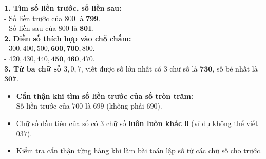 \documentclass[10pt,a4paper]{article}
\begin{document}
\vspace{-1.5mm}
\noindent
\begin{minipage}[t]{0.49\textwidth}\vspace{0pt}
\begin{tcolorbox}[
  enhanced,
  colback=green!4!white,
  colframe=green!60!black,
  arc=2mm, boxrule=0.8pt,
  left=2mm, right=2mm, top=1.8mm, bottom=1.8mm,
  title={\footnotesize\bfseries\color{white}\faCheckCircle\ 4. Bài tập thực hành tiêu biểu}
]
{\footnotesize
\textbf{1. Tìm số liền trước, số liền sau:}\\
- Số liền trước của $800$ là $\mathbf{799}$.\\
- Số liền sau của $800$ là $\mathbf{801}$.\\
\textbf{2. Điền số thích hợp vào chỗ chấm:}\\
- $300, 400, 500, \mathbf{600}, \mathbf{700}, 800$.\\
- $420, 430, 440, \mathbf{450}, \mathbf{460}, 470$.\\
\textbf{3. Từ ba chữ số $3, 0, 7$}, viết được số lớn nhất có 3 chữ số là $\mathbf{730}$, số bé nhất là $\mathbf{307}$.
}
\end{tcolorbox}
\end{minipage}
\hfill
\begin{minipage}[t]{0.49\textwidth}\vspace{0pt}
\begin{tcolorbox}[
  enhanced,
  colback=rose!4!white,
  colframe=rose!70!black,
  arc=2mm, boxrule=0.8pt,
  left=2mm, right=2mm, top=1.8mm, bottom=1.8mm,
  title={\footnotesize\bfseries\color{white}\faExclamationTriangle\ 5. Lời khuyên khi làm bài thi}
]
{\footnotesize
\begin{itemize}\setlength{\itemsep}{1.5pt}\setlength{\leftskip}{-2.5mm}
  \item \textbf{Cẩn thận khi tìm số liền trước của số tròn trăm:}\\
  Số liền trước của $700$ là $699$ (không phải $690$).
  \item Chữ số đầu tiên của số có 3 chữ số \textbf{luôn luôn khác 0} (ví dụ không thể viết $037$).
  \item Kiểm tra cẩn thận từng hàng khi làm bài toán lập số từ các chữ số cho trước.
\end{itemize}
}
\end{tcolorbox}
\end{minipage}
\end{document}
